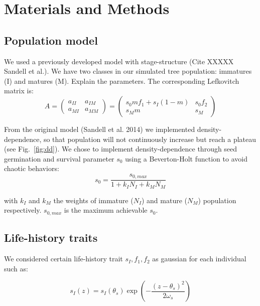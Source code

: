 \label{sec:M&M}
\section*{Materials and Methods}

\subsection*{Population model}

We used a previously developed model with stage-structure (Cite XXXXX Sandell et al.). We have two classes in our simulated tree population: immatures (I) and matures (M).
Explain the parameters.
The corresponding Lefkovitch matrix is:
\begin{equation}
	\label{eq:popmat}
	A =
	\begin{pmatrix}
	a_{II} & a_{IM} \\
	a_{MI} & a_{MM}
	\end{pmatrix}
	=
	\begin{pmatrix}
	s_{0} m f_{1} + s_{I} (1 - m) & s_{0} f_{2} \\
	s_{M} m & s_{M}
	\end{pmatrix}
\end{equation}

From the original model (Sandell et al. 2014) we implemented density-dependence, so that population will not continuously increase but reach a plateau (see Fig.~\ref{fig:dd}). We chose to implement density-dependence through seed germination and survival parameter $s_{0}$ using a Beverton-Holt function to avoid chaotic behaviors:
\begin{equation}
	\label{eq:ddfunc}
	s_{0} = \frac{s_{0, max}}{1 + k_{I} N_{I} + k_{M} N_{M}}
\end{equation}

with $k_{I}$ and $k_{M}$ the weights of immature ($N_{I}$) and mature ($N_{M}$) population respectively. $s_{0, max}$ is the maximum achievable $s_{0}$.

\subsection*{Life-history traits}

We considered certain life-history trait $s_{I}, f_{1}, f_{2}$ as gaussian for each individual such as:

\begin{equation}
	\label{eq:indlht}
	s_{I}(z) = s_{I}(\theta_{s})	\exp\left(-\frac{(z - \theta_{s})^2}{2\omega_{s}}\right)
\end{equation}

